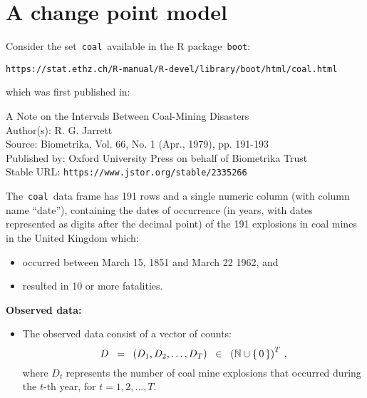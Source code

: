 

\section{A change point model}
\setcounter{theorem}{0}
\setcounter{equation}{0}


\renewcommand{\theenumi}{\roman{enumi}}
\renewcommand{\labelenumi}{\textnormal{(\theenumi)}$\;\;$}


Consider the set \,\texttt{coal}\, available in the R package \,\texttt{boot}:
\begin{center}
\texttt{https://stat.ethz.ch/R-manual/R-devel/library/boot/html/coal.html}
\end{center}
which was first published in:
\begin{center}
\begin{minipage}{5in}
A Note on the Intervals Between Coal-Mining Disasters \\
Author(s): R. G. Jarrett \\
Source: Biometrika, Vol. 66, No. 1 (Apr., 1979), pp. 191-193 \\
Published by: Oxford University Press on behalf of Biometrika Trust \\
Stable URL: \texttt{https://www.jstor.org/stable/2335266}
\end{minipage}
\end{center}

\vskip 0.5cm
\noindent
The \,\texttt{coal}\, data frame has 191 rows and a single numeric column (with column name ``date''),
containing the dates of occurrence (in years, with dates represented as digits after the decimal point)
of the 191 explosions in coal mines in the United Kingdom which:
\begin{itemize}
\item
	occurred between March 15, 1851 and March 22 1962, and
\item
	resulted in 10 or more fatalities.
\end{itemize}


\vskip 0.5cm
\noindent
\textbf{Observed data:}
\begin{itemize}
\item
	The observed data consist of a vector of counts:
	\begin{equation*}
	D \;\; = \;\; (D_{1}, D_{2}, \ldots , D_{T}) \;\; \in \;\; \left(\mathbb{N}\cup\{\,0\,\}\right)^{T}\,,
	\end{equation*}
	where
	$D_{t}$ represents the number of coal mine explosions that occurred during the $t$-th year,
	for $t = 1, 2, \ldots, T$.
\end{itemize}

